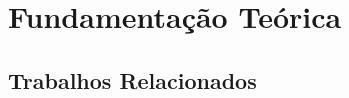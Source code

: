 \chapter{Fundamentação Teórica}
\label{cap2}



\section{Trabalhos Relacionados}
\label{sec:similares}
